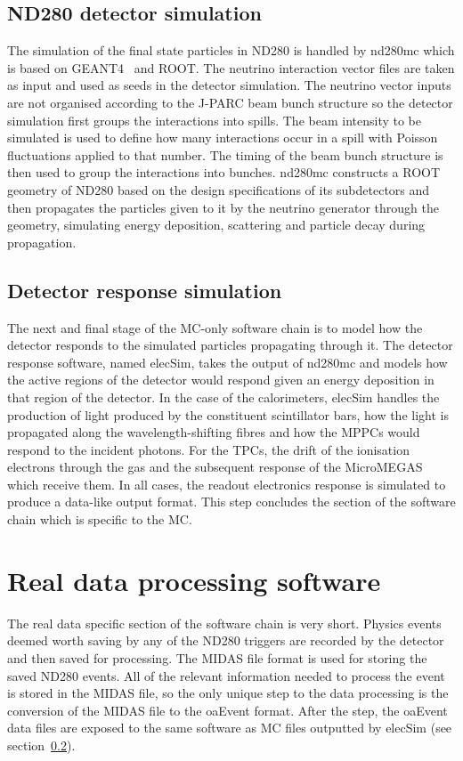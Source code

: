 \subsection{ND280 detector simulation}
\label{subsec:ND280DetectorSimulation}
The simulation of the final state particles in ND280 is handled by nd280mc which is based on GEANT4~\cite{Agostinelli2003250} and ROOT.  The neutrino interaction vector files are taken as input and used as seeds in the detector simulation.  The neutrino vector inputs are not organised according to the J-PARC beam bunch structure so the detector simulation first groups the interactions into spills.  The beam intensity to be simulated is used to define how many interactions occur in a spill with Poisson fluctuations applied to that number.  The timing of the beam bunch structure is then used to group the interactions into bunches. 
\newline
\newline
nd280mc constructs a ROOT geometry of ND280 based on the design specifications of its subdetectors and then propagates the particles given to it by the neutrino generator through the geometry, simulating energy deposition, scattering and particle decay during propagation.

\subsection{Detector response simulation}
\label{subsec:DetectorResponseSimulation}
The next and final stage of the MC-only software chain is to model how the detector responds to the simulated particles propagating through it.  The detector response software, named elecSim, takes the output of nd280mc and models how the active regions of the detector would respond given an energy deposition in that region of the detector.  In the case of the calorimeters, elecSim handles the production of light produced by the constituent scintillator bars, how the light is propagated along the wavelength-shifting fibres and how the MPPCs would respond to the incident photons.  For the TPCs, the drift of the ionisation electrons through the gas and the subsequent response of the MicroMEGAS which receive them.  In all cases, the readout electronics response is simulated to produce a data-like output format.  This step concludes the section of the software chain which is specific to the MC.

\section{Real data processing software}
\label{sec:datachain}
The real data specific section of the software chain is very short.  Physics events deemed worth saving by any of the ND280 triggers are recorded by the detector and then saved for processing.  The MIDAS file format is used for storing the saved ND280 events.  All of the relevant information needed to process the event is stored in the MIDAS file, so the only unique step to the data processing is the conversion of the MIDAS file to the oaEvent format.  After the step, the oaEvent data files are exposed to the same software as MC files outputted by elecSim (see section~\ref{subsec:DetectorResponseSimulation}).


